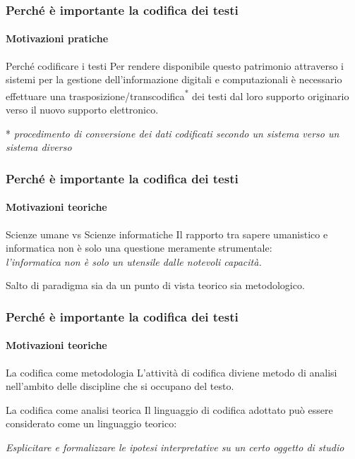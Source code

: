 \begin{frame}
    \frametitle{Perché è importante la codifica dei testi}
    \framesubtitle{Motivazioni pratiche}
    \addtocounter{nframe}{1}
    
    \begin{block}{Perché codificare i testi}
        Per rendere disponibile questo patrimonio attraverso i sistemi per la gestione dell'informazione digitali e computazionali è necessario effettuare una trasposizione/transcodifica\textsuperscript{*} dei testi dal loro supporto originario verso il nuovo supporto elettronico.
    \end{block}

    \begin{center}
        * \textit{procedimento di conversione dei dati codificati secondo un sistema verso un sistema diverso}
    \end{center}

\end{frame}

\begin{frame}
    \frametitle{Perché è importante la codifica dei testi}
    \framesubtitle{Motivazioni teoriche}
    \addtocounter{nframe}{1}
    
    \begin{block}{Scienze umane vs Scienze informatiche}
        Il rapporto tra sapere umanistico e informatica non è solo una questione meramente strumentale:\\ 
        \textit{l'informatica non è solo un utensile dalle notevoli capacità.}

        \begin{center}
            Salto di paradigma sia da un punto di vista teorico sia metodologico.
        \end{center} 
    \end{block}

\end{frame}

\begin{frame}
    \frametitle{Perché è importante la codifica dei testi}
    \framesubtitle{Motivazioni teoriche}
    \addtocounter{nframe}{1}
    
    \begin{block}{La codifica come metodologia}
        L'attività di codifica diviene metodo di analisi nell'ambito delle discipline che si occupano del testo.
     \end{block}

     \begin{block}{La codifica come analisi teorica}
     Il linguaggio di codifica adottato può essere considerato come un linguaggio teorico:
      
     \begin{center}
        \textit{Esplicitare e formalizzare le ipotesi interpretative su un certo oggetto di studio}
     \end{center} 
    \end{block}

\end{frame}

